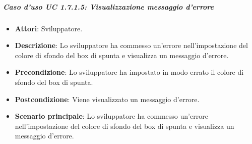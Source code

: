 \subparagraph{Caso d'uso UC 1.7.1.5: Visualizzazione messaggio d'errore}

\FloatBarrier
\begin{itemize}
\item\textbf{Attori}: Sviluppatore.
\item\textbf{Descrizione}: Lo sviluppatore ha commesso un'errore nell'impostazione del colore di sfondo del box di spunta e visualizza un messaggio d'errore.
\item\textbf{Precondizione}: Lo sviluppatore ha impostato in modo errato il colore di sfondo del box di spunta.
\item\textbf{Postcondizione}: Viene visualizzato un messaggio d'errore.
\item\textbf{Scenario principale}: Lo sviluppatore ha commesso un'errore nell'impostazione del colore di sfondo del box di spunta e visualizza un messaggio d'errore.
\end{itemize}